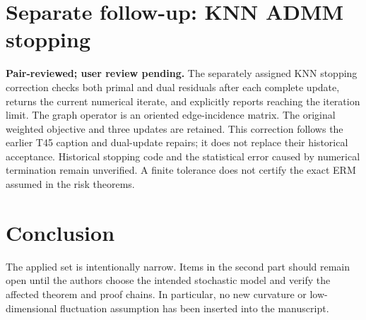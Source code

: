 \documentclass[10pt]{article}
\begin{document}
\section*{Separate follow-up: KNN ADMM stopping}
\textcolor{deferredred}{\textbf{Pair-reviewed; user review pending.}
The separately assigned KNN stopping correction checks both primal and dual
residuals after each complete update, returns the current numerical iterate,
and explicitly reports reaching the iteration limit. The graph operator is
an oriented edge-incidence matrix. The original weighted objective and
three updates are retained. This correction follows the earlier T45
caption and dual-update repairs; it does not replace their historical
acceptance. Historical stopping code and the statistical error caused by
numerical termination remain unverified. A finite tolerance does not
certify the exact ERM assumed in the risk theorems.}

\section*{Conclusion}
The applied set is intentionally narrow. Items in the second part should remain
open until the authors choose the intended stochastic model and verify the
affected theorem and proof chains. In particular, no new curvature or
low-dimensional fluctuation assumption has been inserted into the manuscript.
\end{document}
